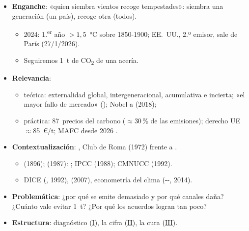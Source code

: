 \documentclass{article}
\begin{document}
\cabecerarepaso
\begin{columnas}

\begin{itemize}
\item \textbf{Enganche}: «quien siembra vientos recoge tempestades»: siembra una generación (un país), recoge otra (todos).
  \begin{itemize}
  \item 2024: 1.\textsuperscript{er} año $>1{,}5$~°C sobre 1850-1900; EE.~UU., 2.º emisor, sale de París (27/1/2026).
  \item Seguiremos 1~t de CO\textsubscript{2} de una acería.
  \end{itemize}
\item \textbf{Relevancia}:
  \begin{itemize}
  \item teórica: externalidad global, intergeneracional, acumulativa e incierta; «el mayor fallo de mercado» (); Nobel a  (2018);
  \item práctica: 87~precios del carbono ($\approx$30\,\% de las emisiones); derecho UE $\approx$85~€/t; MAFC desde 2026  .
  \end{itemize}
\item \textbf{Contextualización}: , Club de Roma (1972) frente a  .
  \begin{itemize}
  \item {} (1896);  (1987): ; IPCC (1988); CMNUCC (1992).
  \item DICE (, 1992),  (2007), econometría del clima (--, 2014).
  \end{itemize}
\item \textbf{Problemática}: ¿por qué se emite demasiado y por qué canales daña? ¿Cuánto vale evitar 1~t? ¿Por qué los acuerdos logran tan poco?
\item \textbf{Estructura}: diagnóstico (\hyperref[rep:I]{I}), la cifra (\hyperref[rep:II]{II}), la cura (\hyperref[rep:III]{III}).
\end{itemize}


\end{columnas}
\end{document}
